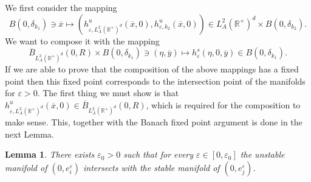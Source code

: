 \documentclass[11pt, leqno]{amsart}
\newtheorem{lem}[thm]{Lemma}
\theoremstyle{definition}
\def\R{\mathbb{R}}
\begin{document}
We first consider the mapping
$$
B(0,\delta_{k_1})\ni \overline{x} \mapsto (h^u_{\varepsilon,L^2_A(\R^+)^d}(\overline{x},0),h^u_{\varepsilon,k_2}(\overline{x},0))\in L^2_A( \R^+)^d\times B(0,\delta_{k_2}).
$$
We want to compose it with the mapping
$$
 \overline{B}_{L^2_A( \R^+)^d}(0,R)\times B(0,\delta_{k_1}) \ni (\eta,\overline{y}) \mapsto h^s_\varepsilon(\eta,0,\overline{y}) \in B(0,\delta_{k_1}).
$$
If we are able to prove that the composition of the above mappings has a fixed point then this fixed point corresponds to the intersection point of the manifolds for $\varepsilon>0$. The first thing we must show is that $h^u_{\varepsilon,L^2_A(\R^+)^d}(\overline{x},0) \in \overline{B}_{L^2_A( \R^+)^d}(0,R)$, which is required for the composition to make sense. This, together with the Banach fixed point argument is done in the next Lemma.  
\begin{lem}\label{lem:intersection}
	There exists $\varepsilon_0>0$ such that for every $\varepsilon\in [0,\varepsilon_0]$ the unstable manifold of $(0,e^\varepsilon_i)$ intersects with the stable manifold of $(0,e^\varepsilon_j)$.
\end{lem}
\end{document}
